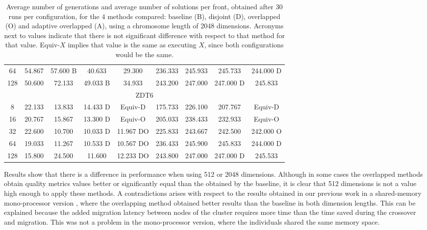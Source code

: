 \documentclass[preprint]{elsarticle}
\begin{document}
\begin{table*}
{\begin{tabular}{|c||c|c|c|c||c|c|c|c||}
64	&	54.867		&	57.600	B	&	40.633			&	29.300			&	236.333		&	245.933			&	245.733			&	244.000	D			\\
128	&	50.600		&	72.133		&	49.033	B		&	34.933			&	243.200		&	247.000			&	247.000	D		&	245.833				\\ \hline
\multicolumn{9}{|c|}{ZDT6}																															\\ \hline
8	&	22.133		&	13.833		&	14.433	D		&	Equiv-D			&	175.733		&	226.100			&	207.767			&	Equiv-D				\\
16	&	20.767		&	15.867		&	13.300	D		&	Equiv-O			&	205.033		&	238.433			&	232.933			&	Equiv-O				\\
32	&	22.600		&	10.700		&	10.033	D		&	11.967	DO		&	225.833		&	243.667			&	242.500			&	242.000	O			\\
64	&	19.033		&	11.267		&	10.533	D		&	10.567	DO		&	236.433		&	245.900			&	245.833			&	244.000	D			\\
128	&	15.800		&	24.500		&	11.600			&	12.233	DO		&	243.800		&	247.000			&	247.000	D		&	245.533				\\ \hline
\end{tabular}
}
\caption{Average number of generations and average number of solutions per front, obtained after 30 runs per configuration, for the 4 methods compared: baseline (B), disjoint (D), overlapped (O) and adaptive overlapped (A), using a chromosome length of 2048 dimensions. Acronyms next to values indicate that there is not significant difference with respect to that method for that value. Equiv-$X$ implies that value is the same as executing $X$, since both configurations would be the same.}
\label{tab:sols2048}
\end{table*}

Results show that there is a difference in performance when using 512 or 2048 dimensions. Although in some cases the overlapped methods obtain quality metrics values better or significantly equal than the obtained by the baseline, it is clear that 512 dimensions is not a value high enough to apply these methods. A contradictions arises with respect to the results obtained in our previous work in a shared-memory mono-processor version \citep{Garcia16hpmoon}, where the overlapping method obtained better results than the baseline in both dimension lengths. This can be explained because the added migration latency between nodes of the cluster requires more time than the time saved during the crossover and migration. This was not a problem in the mono-processor version, where the individuals shared the same memory space.
\end{document}
